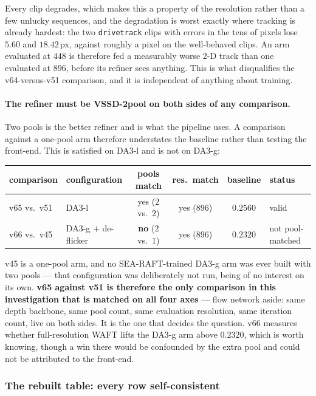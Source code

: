 \documentclass[11pt,a4paper]{article}
\begin{document}
Every clip degrades, which makes this a property of the resolution rather than a few unlucky
sequences,
and the degradation is worst exactly where tracking is already hardest: the two \texttt{drivetrack}
clips with errors in the tens of pixels lose $5.60$ and $18.42$\,px, against roughly a pixel on the
well-behaved clips. An arm evaluated at $448$ is therefore fed a measurably worse 2-D track than one
evaluated at $896$, before its refiner sees anything. This is what disqualifies the v64-versus-v51
comparison, and it is independent of anything about training.

\paragraph{The refiner must be VSSD-2pool on both sides of any comparison.} Two pools is the better
refiner and is what the pipeline uses. A comparison against a one-pool arm therefore understates
the baseline rather than testing the front-end. This is satisfied on DA3-l and is not on DA3-g:

\begin{center}\small
\begin{tabular}{llcccl}
\toprule
comparison & configuration & pools match & res.\ match & baseline & status \\
\midrule
v65 vs.\ v51 & DA3-l                      & yes ($2$ vs.\ $2$) & yes ($896$) & $0.2560$ & valid \\
v66 vs.\ v45 & DA3-g $+$ de-flicker       & \textbf{no} ($2$ vs.\ $1$) & yes ($896$) & $0.2320$ & not pool-matched \\
\bottomrule
\end{tabular}
\end{center}

\noindent v45 is a one-pool arm, and no SEA-RAFT-trained DA3-g arm was ever built with two pools ---
that configuration was deliberately not run, being of no interest on its own. \textbf{v65 against
v51 is therefore the only comparison in this investigation that is matched on all four axes} --- flow network
aside: same depth backbone, same pool count, same evaluation resolution, same iteration count, live
on both sides. It is the one that decides the question. v66 measures whether full-resolution WAFT
lifts the DA3-g arm above $0.2320$, which is worth knowing, though a win there would be confounded by
the extra pool and could not be attributed to the front-end.

\subsubsection{The rebuilt table: every row self-consistent}
\label{sec:waft-rebuilt}
\end{document}

